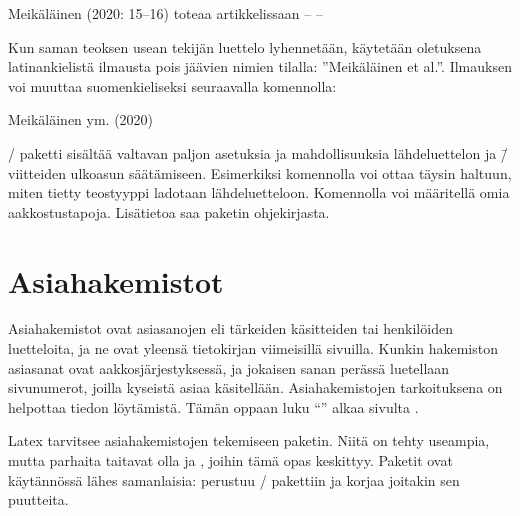 \begin{tulossis}
  Meikäläinen (2020: 15--16) toteaa artikkelissaan -- --
\end{tulossis}

\noindent
Kun saman teoksen usean tekijän luettelo lyhennetään, käytetään
oletuksena latinankielistä ilmausta pois jäävien nimien tilalla:
''Meikäläinen et al.''. Ilmauksen voi muuttaa suomenkieliseksi
seuraavalla komennolla:

\begin{koodilohkosis}
\end{koodilohkosis}

\begin{tulossis}
  Meikäläinen ym. (2020)
\end{tulossis}

\noindent
{}\-/ paketti sisältää valtavan paljon asetuksia ja
mahdollisuuksia lähdeluettelon ja \=/viitteiden ulkoasun säätämiseen.
Esimerkiksi komennolla  voi ottaa
täysin haltuun, miten tietty teostyyppi ladotaan lähdeluetteloon.
Komennolla  voi määritellä omia
aakkostustapoja. Lisätietoa saa paketin ohjekirjasta.

\section{Asiahakemistot}
\label{luku/asiasanat}

Asiahakemistot ovat asiasanojen eli tärkeiden käsitteiden tai
henkilöiden luetteloita, ja ne ovat yleensä tietokirjan viimeisillä
sivuilla. Kunkin hakemiston asiasanat ovat aakkosjärjestyksessä, ja
jokaisen sanan perässä luetellaan sivunumerot, joilla kyseistä asiaa
käsitellään. Asiahakemistojen tarkoituksena on helpottaa tiedon
löytämistä. Tämän oppaan luku \enquote{}
alkaa sivulta \pageref{luku/asiahakemisto}.

Latex tarvitsee asiahakemistojen tekemiseen paketin. Niitä on tehty
useampia, mutta parhaita taitavat olla  ja
, joihin tämä opas keskittyy. Paketit ovat
käytännössä lähes samanlaisia:  perustuu
\-/ pakettiin ja korjaa joitakin sen puutteita.

\begin{esimerkki*}

  \caption{Asiahakemistojen toteutuksen perusteet}
  \label{esim/asiasanat-perus}
\end{esimerkki*}

